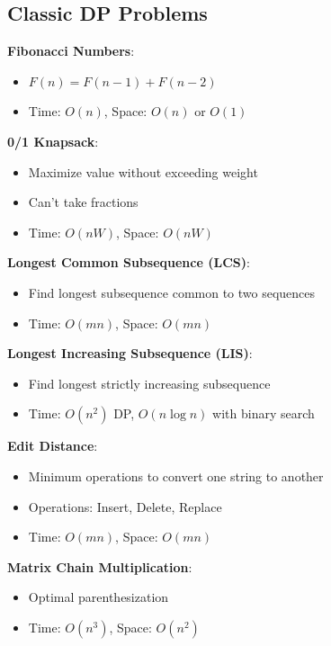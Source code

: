 \documentclass[12pt,a4paper]{report}
\begin{document}
\subsection{Classic DP Problems}
\begin{concept}
\textbf{Fibonacci Numbers}:
\begin{itemize}
    \item $F(n) = F(n-1) + F(n-2)$
    \item Time: $O(n)$, Space: $O(n)$ or $O(1)$
\end{itemize}

\textbf{0/1 Knapsack}:
\begin{itemize}
    \item Maximize value without exceeding weight
    \item Can't take fractions
    \item Time: $O(nW)$, Space: $O(nW)$
\end{itemize}

\textbf{Longest Common Subsequence (LCS)}:
\begin{itemize}
    \item Find longest subsequence common to two sequences
    \item Time: $O(mn)$, Space: $O(mn)$
\end{itemize}

\textbf{Longest Increasing Subsequence (LIS)}:
\begin{itemize}
    \item Find longest strictly increasing subsequence
    \item Time: $O(n^2)$ DP, $O(n \log n)$ with binary search
\end{itemize}

\textbf{Edit Distance}:
\begin{itemize}
    \item Minimum operations to convert one string to another
    \item Operations: Insert, Delete, Replace
    \item Time: $O(mn)$, Space: $O(mn)$
\end{itemize}

\textbf{Matrix Chain Multiplication}:
\begin{itemize}
    \item Optimal parenthesization
    \item Time: $O(n^3)$, Space: $O(n^2)$
\end{itemize}
\end{concept}
\end{document}
